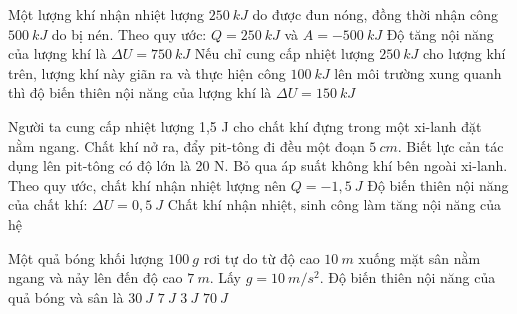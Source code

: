 \begin{ex}
Một lượng khí nhận nhiệt lượng $250 \ kJ$ do được đun nóng, đồng thời nhận công $500 \ kJ$ do bị nén.
{Theo quy ước: $Q=250 \ kJ$ và $A=-500 \ kJ$}
{\True Độ tăng nội năng của lượng khí là $\Delta U=750 \ kJ$}
{\True Nếu chỉ cung cấp nhiệt lượng $250 \ kJ$ cho lượng khí trên, lượng khí này giãn ra và thực hiện công $100 \ kJ$ lên môi trường xung quanh thì độ biến thiên nội năng của lượng khí là $\Delta U=150 \ kJ$}
\end{ex}
\begin{ex}
Người ta cung cấp nhiệt lượng 1,5 J cho chất khí đựng trong một xi-lanh đặt nằm ngang. Chất khí nở ra, đẩy pit-tông đi đều một đoạn $5 \ cm$. Biết lực cản tác dụng lên pit-tông có độ lớn là 20 N. Bỏ qua áp suất không khí bên ngoài xi-lanh.
{Theo quy ước, chất khí nhận nhiệt lượng nên $Q=-1,5 \ J$}
{\True Độ biến thiên nội năng của chất khí: $\Delta U=0,5 \ J$}
{\True Chất khí nhận nhiệt, sinh công làm tăng nội năng của hệ}
\end{ex}
\begin{ex}
	Một quả bóng khối lượng $100\ g$ rơi tự do từ độ cao $10\ m$ xuống mặt sân nằm ngang và nảy lên đến độ cao $7\ m$. Lấy $g=10\ m/s^2$. Độ biến thiên nội năng của quả bóng và sân là
	\choice
	{$30\ J$}
	{$7\ J$}
	{\True $3\ J$}
	{$70\ J$}
	\end{ex}
